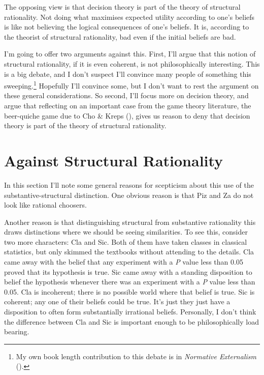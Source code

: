 \documentclass[
  12pt,
  letterpaper,
  DIV=11,
  numbers=noendperiod]{scrreprt}
\begin{document}
The opposing view is that decision theory is part of the theory of
structural rationality. Not doing what maximises expected utility
according to one's beliefs is like not believing the logical
consequences of one's beliefs. It is, according to the theorist of
structural rationality, bad even if the initial beliefs are bad.

I'm going to offer two arguments against this. First, I'll argue that
this notion of structural rationality, if it is even coherent, is not
philosophically interesting. This is a big debate, and I don't suspect
I'll convince many people of something this sweeping.\footnote{My own
  book length contribution to this debate is in \emph{Normative
  Externalism} ().}
Hopefully I'll convince some, but I don't want to rest the argument on
these general considerations. So second, I'll focus more on decision
theory, and argue that reflecting on an important case from the game
theory literature, the beer-quiche game due to Cho \& Kreps
(), gives us reason to deny that
decision theory is part of the theory of structural rationality.

\section{Against Structural Rationality}\label{sec-against-structural}

In this section I'll note some general reasons for scepticism about this
use of the substantive-structural distinction. One obvious reason is
that Piz and Za do not look like rational choosers.

Another reason is that distinguishing structural from substantive
rationality this draws distinctions where we should be seeing
similarities. To see this, consider two more characters: Cla and Sic.
Both of them have taken classes in classical statistics, but only
skimmed the textbooks without attending to the details. Cla came away
with the belief that any experiment with a \emph{P} value less than 0.05
proved that its hypothesis is true. Sic came away with a standing
disposition to belief the hypothesis whenever there was an experiment
with a \emph{P} value less than 0.05. Cla is incoherent; there is no
possible world where that belief is true. Sic is coherent; any one of
their beliefs could be true. It's just they just have a disposition to
often form substantially irrational beliefs. Personally, I don't think
the difference between Cla and Sic is important enough to be
philosophically load bearing.
\end{document}
